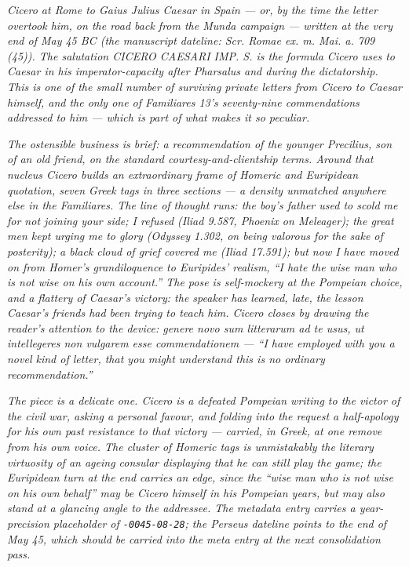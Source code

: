 
\textit{Cicero at Rome to Gaius Julius Caesar in Spain --- or, by
the time the letter overtook him, on the road back from the
Munda campaign --- written at the very end of May 45 BC (the
manuscript dateline: \textit{Scr. Romae ex. m. Mai. a. 709
(45)}). The salutation \textit{CICERO CAESARI IMP. S.} is the
formula Cicero uses to Caesar in his \textit{imperator}-capacity
after Pharsalus and during the dictatorship. This is one of the
small number of surviving private letters from Cicero to Caesar
himself, and the only one of \textit{Familiares} 13's
seventy-nine commendations addressed to him --- which is part of
what makes it so peculiar.}

\textit{The ostensible business is brief: a recommendation of
the younger Precilius, son of an old friend, on the standard
courtesy-and-clientship terms. Around that nucleus Cicero builds
an extraordinary frame of Homeric and Euripidean quotation,
seven Greek tags in three sections --- a density unmatched
anywhere else in the \textit{Familiares}. The line of thought
runs: the boy's father used to scold me for not joining your
side; I refused (Iliad 9.587, Phoenix on Meleager); the great
men kept urging me to glory (Odyssey 1.302, on being valorous
for the sake of posterity); a black cloud of grief covered me
(Iliad 17.591); but now I have moved on from Homer's grandiloquence
to Euripides' realism, ``I hate the wise man who is not wise on
his own account.'' The pose is self-mockery at the Pompeian
choice, and a flattery of Caesar's victory: the speaker has
learned, late, the lesson Caesar's friends had been trying to
teach him. Cicero closes by drawing the reader's attention to
the device: \textit{genere novo sum litterarum ad te usus, ut
intellegeres non vulgarem esse commendationem} --- ``I have
employed with you a novel kind of letter, that you might
understand this is no ordinary recommendation.''}

\textit{The piece is a delicate one. Cicero is a defeated
Pompeian writing to the victor of the civil war, asking a
personal favour, and folding into the request a half-apology
for his own past resistance to that victory --- carried, in
Greek, at one remove from his own voice. The cluster of
Homeric tags is unmistakably the literary virtuosity of an
ageing consular displaying that he can still play the game;
the Euripidean turn at the end carries an edge, since the
``wise man who is not wise on his own behalf'' may be Cicero
himself in his Pompeian years, but may also stand at a glancing
angle to the addressee. The metadata entry carries a year-
precision placeholder of \texttt{-0045-08-28}; the Perseus
dateline points to the end of May 45, which should be carried
into the meta entry at the next consolidation pass.}
